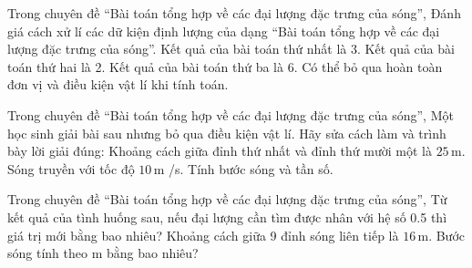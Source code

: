 \begin{ex}
Trong chuyên đề “Bài toán tổng hợp về các đại lượng đặc trưng của sóng”, Đánh giá cách xử lí các dữ kiện định lượng của dạng “Bài toán tổng hợp về các đại lượng đặc trưng của sóng”.
\choiceTF
{\True Kết quả của bài toán thứ nhất là 3.}
{\True Kết quả của bài toán thứ hai là 2.}
{\True Kết quả của bài toán thứ ba là 6.}
{Có thể bỏ qua hoàn toàn đơn vị và điều kiện vật lí khi tính toán.}
\end{ex}

\begin{ex}
Trong chuyên đề “Bài toán tổng hợp về các đại lượng đặc trưng của sóng”, Một học sinh giải bài sau nhưng bỏ qua điều kiện vật lí. Hãy sửa cách làm và trình bày lời giải đúng: Khoảng cách giữa đỉnh thứ nhất và đỉnh thứ mười một là $25\,\text{m}$. Sóng truyền với tốc độ $10\,\text{m}$ /s. Tính bước sóng và tần số.
\choiceTF

\end{ex}

\begin{ex}
Trong chuyên đề “Bài toán tổng hợp về các đại lượng đặc trưng của sóng”, Từ kết quả của tình huống sau, nếu đại lượng cần tìm được nhân với hệ số 0.5 thì giá trị mới bằng bao nhiêu? Khoảng cách giữa 9 đỉnh sóng liên tiếp là $16\,\text{m}$. Bước sóng tính theo m bằng bao nhiêu?
\end{ex}

